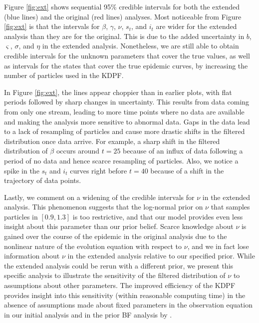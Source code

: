 \documentclass{elsarticle}
\begin{document}
Figure \ref{fig:ext} shows sequential 95\% credible intervals for both the extended (blue lines) and the original (red lines) analyses. Most noticeable from Figure \ref{fig:ext} is that the intervals for $\beta$, $\gamma$, $\nu$, $s_t$, and $i_t$ are wider for the extended analysis than they are for the original. This is due to the added uncertainty in $b$, $\varsigma$, $\sigma$, and $\eta$ in the extended analysis. Nonetheless, we are still able to obtain credible intervals for the unknown parameters that cover the true values, as well as intervals for the states that cover the true epidemic curves, by increasing the number of particles used in the KDPF.

In Figure \ref{fig:ext}, the lines appear choppier than in earlier plots, with flat periods followed by sharp changes in uncertainty. This results from data coming from only one stream, leading to more time points where no data are available and making the analysis more sensitive to abnormal data. Gaps in the data lead to a lack of resampling of particles and cause more drastic shifts in the filtered distribution once data arrive. For example, a sharp shift in the filtered distribution of $\beta$ occurs around $t = 25$ because of an influx of data following a period of no data and hence scarce resampling of particles. Also, we notice a spike in the $s_t$ and $i_t$ curves right before $t = 40$ because of a shift in the trajectory of data points.

Lastly, we comment on a widening of the credible intervals for $\nu$ in the extended analysis. This phenomenon suggests that the log-normal prior on $\nu$ that samples particles in $[0.9,1.3]$ is too restrictive, and that our model provides even less insight about this parameter than our prior belief. Scarce knowledge about $\nu$ is gained over the course of the epidemic in the original analysis due to the nonlinear nature of the evolution equation with respect to $\nu$, and we in fact lose information about $\nu$ in the extended analysis relative to our specified prior. While the extended analysis could be rerun with a different prior, we present this specific analysis to illustrate the sensitivity of the filtered distribution of $\nu$ to assumptions about other parameters. The improved efficiency of the KDPF provides insight into this sensitivity (within reasonable computing time) in the absence of assumptions made about fixed parameters in the observation equation in our initial analysis and in the prior BF analysis by \citet{skvortsov2012monitoring}.
\end{document}
